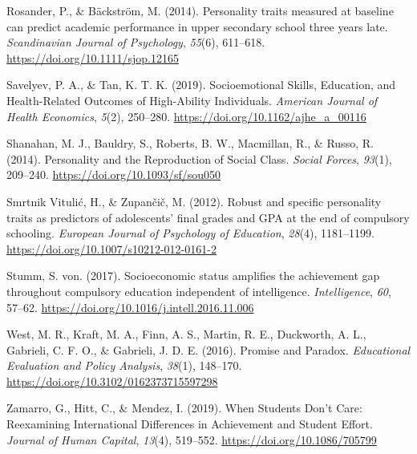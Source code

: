 \documentclass{article}
\newlength{\cslhangindent}
\newlength{\cslentryspacingunit} %
\newenvironment{CSLReferences}[2] %
 {%
  \setlength{\parindent}{0pt}
  \ifodd #1
  \let\oldpar\par
  \def\par{\hangindent=\cslhangindent\oldpar}
  \fi
  \setlength{\parskip}{#2\cslentryspacingunit}
 }%
 {}
\begin{document}
\begin{CSLReferences}{1}{0}
\leavevmode{}%
Rosander, P., \& Bäckström, M. (2014). Personality traits measured at
baseline can predict academic performance in upper secondary school
three years late. \emph{Scandinavian Journal of Psychology},
\emph{55}(6), 611--618. \url{https://doi.org/10.1111/sjop.12165}

\leavevmode{}%
Savelyev, P. A., \& Tan, K. T. K. (2019). Socioemotional Skills,
Education, and Health-Related Outcomes of High-Ability Individuals.
\emph{American Journal of Health Economics}, \emph{5}(2), 250--280.
\url{https://doi.org/10.1162/ajhe_a_00116}

\leavevmode{}%
Shanahan, M. J., Bauldry, S., Roberts, B. W., Macmillan, R., \& Russo,
R. (2014). Personality and the Reproduction of Social Class.
\emph{Social Forces}, \emph{93}(1), 209--240.
\url{https://doi.org/10.1093/sf/sou050}

\leavevmode{}%
Smrtnik Vitulić, H., \& Zupančič, M. (2012). Robust and specific
personality traits as predictors of adolescents{'} final grades and GPA
at the end of compulsory schooling. \emph{European Journal of Psychology
of Education}, \emph{28}(4), 1181--1199.
\url{https://doi.org/10.1007/s10212-012-0161-2}

\leavevmode{}%
Stumm, S. von. (2017). Socioeconomic status amplifies the achievement
gap throughout compulsory education independent of intelligence.
\emph{Intelligence}, \emph{60}, 57--62.
\url{https://doi.org/10.1016/j.intell.2016.11.006}

\leavevmode{}%
West, M. R., Kraft, M. A., Finn, A. S., Martin, R. E., Duckworth, A. L.,
Gabrieli, C. F. O., \& Gabrieli, J. D. E. (2016). Promise and Paradox.
\emph{Educational Evaluation and Policy Analysis}, \emph{38}(1),
148--170. \url{https://doi.org/10.3102/0162373715597298}

\leavevmode{}%
Zamarro, G., Hitt, C., \& Mendez, I. (2019). When Students Don{'}t Care:
Reexamining International Differences in Achievement and Student Effort.
\emph{Journal of Human Capital}, \emph{13}(4), 519--552.
\url{https://doi.org/10.1086/705799}

\end{CSLReferences}



\end{document}
